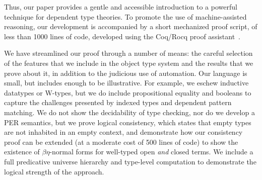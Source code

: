 \documentclass[acmsmall,screen=true,
\ifpublic review=false\else,review=true\fi
  ,anonymous=\ifanonymous true\else false\fi]{acmart}
\newcommand{\lang}{$\lambda^{U\mathbb{B}\ottkw{Id}}$\xspace}
\newcommand{\scw}[1]{}
\newcommand{\yl}[1]{}
\begin{document}
Thus, our paper provides a gentle and accessible introduction to a powerful
technique for dependent type theories. To promote the use of machine-assisted
reasoning, our development is accompanied by a short mechanized proof script,
of less than 1000 lines of code, developed using the Coq/Rocq proof
assistant~\cite{coq}.

We have streamlined our proof through a number of means: the careful selection
of the features that we include in the object type system and the results
that we prove about it, in addition to the judicious use of automation.  Our
language is small, but includes enough to be illustrative. For example, we
eschew inductive datatypes or W-types, but we do include propositional
equality and booleans to capture the challenges presented by indexed
types and dependent pattern matching. We do not show the decidability of type
checking, nor do we develop a PER semantics, but we prove logical consistency, which states that empty types are not inhabited in an empty context, and demonstrate how our
consistency proof can be extended (at a moderate cost of 500 lines of code) to
show the existence of $\beta\eta$-normal forms for well-typed open \emph{and}
closed terms. We include a full predicative universe hierarchy and
type-level computation to demonstrate the logical strength of the
approach. %
\end{document}
